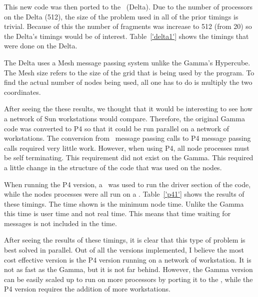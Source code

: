 

This new code was then ported to the \delta\ (Delta).  Due to the number of
processors on the Delta (512),
the size of the problem used in all of the prior timings is trivial.
Because of this the number of fragments was increase to 512 (from 20) so 
the Delta's
timings would be of interest.  Table~\ref{'delta1'} shows the timings that
were done on the Delta.  



The Delta uses a Mesh message passing system
unlike the Gamma's Hypercube.  The Mesh size refers to the size of the grid
that is being used by the program.  To find the actual number of nodes
being used, all one has to do is multiply the two coordinates.

After seeing the these results, we thought that it would be interesting to
see how a network of Sun workstations would compare.
Therefore, the original Gamma code was converted to P4 so that it could be
run parallel on a network of workstations.  The conversion from \gamma\
message passing calls to P4 message passing calls required very little
work.  However, when using P4, all node processes must be self terminating.
This requirement did not exist on the Gamma.  This required a little change
in the structure of the code that was used on the nodes.

When running the P4 version, a \achilles\ was used to run the driver section
of the code, while the nodes processes were all run on a \ariel.  
Table~\ref{'p41'} shows the results of these timings.  The time shown
is the minimum node time.  Unlike the Gamma this time is user time and not
real time.  This means that time waiting for messages is not included in
the time.



After seeing the results of these timings, it is clear that this type of
problem is best solved in parallel.  Out of all the versions implemented, I
believe the most cost effective version is the P4 version running on a
network of workstation.  It is not as fast as the Gamma, but it is not far
behind.  However, the Gamma version can be easily scaled up to run on more
processors by porting it to the \delta, while the P4 version requires the
addition of more workstations.
